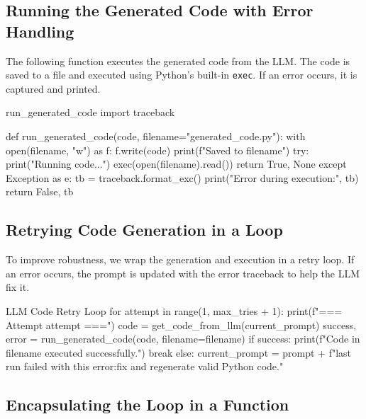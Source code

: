 \subsection*{Running the Generated Code with Error Handling}

The following function executes the generated code from the LLM. The code is saved to a file and executed using Python’s built-in \texttt{exec}. If an error occurs, it is captured and printed.

\begin{codeonly}{run\_generated\_code}
import traceback

def run_generated_code(code, filename="generated_code.py"):
    with open(filename, "w") as f:
        f.write(code)
    print(f"Saved to {filename}")
    try:
        print("Running code...\n")
        exec(open(filename).read())
        return True, None
    except Exception as e:
        tb = traceback.format_exc()
        print("Error during execution:\n", tb)
        return False, tb
\end{codeonly}

%
\subsection*{Retrying Code Generation in a Loop}

To improve robustness, we wrap the generation and execution in a retry loop. If an error occurs, the prompt is updated with the error traceback to help the LLM fix it.

\begin{codeonly}{LLM Code Retry Loop}
for attempt in range(1, max_tries + 1):
    print(f"\n=== Attempt {attempt} ===")
    code = get_code_from_llm(current_prompt)
    success, error = run_generated_code(code, filename=filename)
    if success:
        print(f"Code in {filename} executed successfully.")
        break
    else:
        current_prompt = prompt + f"\n\nThe last run failed with this error:\n\nPlease fix and regenerate valid Python code."
\end{codeonly}

%
\subsection*{Encapsulating the Loop in a Function}

